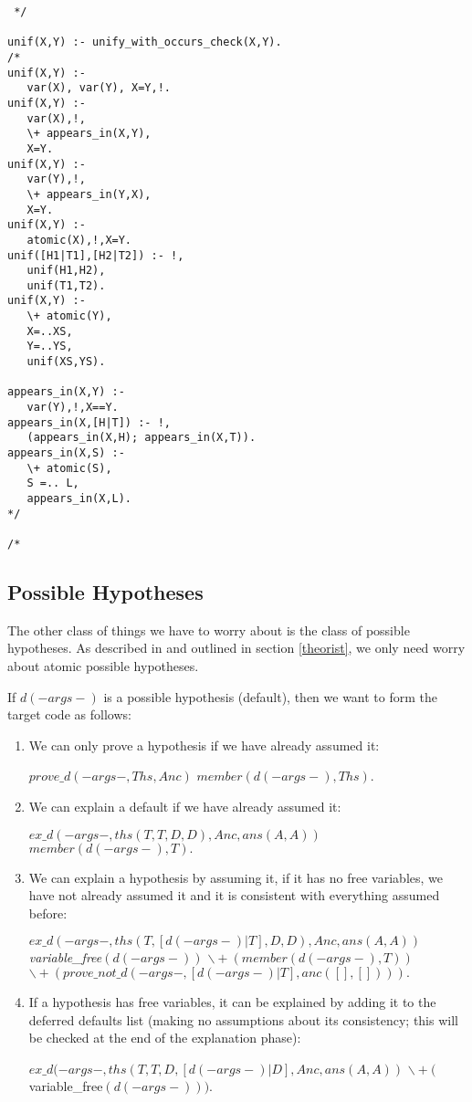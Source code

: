 \begin{verbatim} */

unif(X,Y) :- unify_with_occurs_check(X,Y).
/*
unif(X,Y) :-
   var(X), var(Y), X=Y,!.
unif(X,Y) :-
   var(X),!,
   \+ appears_in(X,Y),
   X=Y.
unif(X,Y) :-
   var(Y),!,
   \+ appears_in(Y,X),
   X=Y.
unif(X,Y) :-
   atomic(X),!,X=Y.
unif([H1|T1],[H2|T2]) :- !,
   unif(H1,H2),
   unif(T1,T2).
unif(X,Y) :-
   \+ atomic(Y),
   X=..XS,
   Y=..YS,
   unif(XS,YS).

appears_in(X,Y) :-
   var(Y),!,X==Y.
appears_in(X,[H|T]) :- !,
   (appears_in(X,H); appears_in(X,T)).
appears_in(X,S) :-
   \+ atomic(S),
   S =.. L,
   appears_in(X,L).
*/

/* \end{verbatim}
\subsection{Possible Hypotheses}
The other class of things we have to worry about is the class
of possible hypotheses. As described in \cite{poole:lf}
and outlined in section \ref{theorist},
we only need worry about atomic possible hypotheses.

If $d(-args-)$ is a possible hypothesis (default),
then we want to form the target code as follows:

\begin{enumerate}
\item We can only prove a hypothesis if we have already assumed it:
\begin{prolog}
$prove\_d(-args-,Ths,Anc) $\IF
$member(d(-args-),Ths).$
\end{prolog}
\item We can explain a default if we have already assumed it:
\begin{prolog}
$ex\_d(-args-,ths(T,T,D,D),Anc,ans(A,A)) $\IF
$member(d(-args-),T).$
\end{prolog}
\item We can explain a hypothesis by assuming it,
if it has no free variables, we have not
already assumed it and it is consistent with everything assumed before:
\begin{prolog} \em
$ex\_d(-args-,ths(T,[d(-args-)|T],D,D),Anc,ans(A,A)) $\IF
variable\_free$(d(-args-))$\AND
$\backslash+(member(d(-args-),T))$\AND
$\backslash+(prove\_not\_d(-args-,[d(-args-)|T],anc([],[]))).$
\end{prolog}
\item 
If a hypothesis has free variables, it can be explained
by adding it to the deferred defaults list (making no assumptions about
its consistency; this will be checked at the end of the explanation phase):
\begin{prolog}
$ex\_d(-args-,ths(T,T,D,[d(-args-)|D],Anc,ans(A,A)) $\IF
$\backslash+($variable\_free$(d(-args-))).$
\end{prolog}
\end{enumerate}

